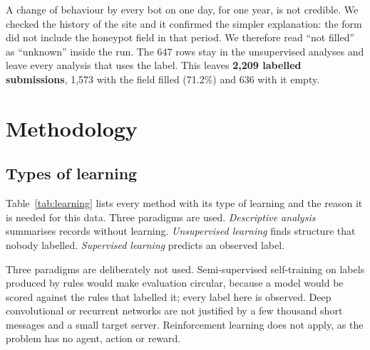 \documentclass[conference]{IEEEtran}
\begin{document}
A change of behaviour by every bot on one day, for one year, is not credible. We checked the history of the
site and it confirmed the simpler explanation: the form did not include the honeypot field in that period. We
therefore read ``not filled'' as ``unknown'' inside the
run. The 647 rows stay in the unsupervised analyses and leave every analysis that uses the label. This leaves
\textbf{2,209 labelled submissions}, 1,573 with the field filled (71.2\%) and 636 with it empty.

\section{Methodology}

\subsection{Types of learning}

Table~\ref{tab:learning} lists every method with its type of learning and the reason it is needed for this
data. Three paradigms are used. \emph{Descriptive analysis} summarises records without learning.
\emph{Unsupervised learning} finds structure that nobody labelled. \emph{Supervised learning} predicts an
observed label.

Three paradigms are deliberately not used. Semi-supervised self-training on labels produced by rules would
make evaluation circular, because a model would be scored against the rules that labelled it; every label here
is observed. Deep convolutional or recurrent networks are not justified by a few thousand short messages and a
small target server. Reinforcement learning does not apply, as the problem has no agent, action or reward.
\end{document}
